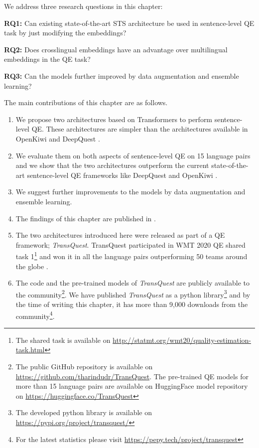 We address three research questions in this chapter:

\textbf{RQ1:} Can existing state-of-the-art STS architecture be used in sentence-level QE task by just modifying the embeddings?

\textbf{RQ2:} Does crosslingual embeddings have an advantage over multilingual embeddings in the QE task?

\textbf{RQ3:} Can the models further improved by data augmentation and ensemble learning?

     
The main contributions of this chapter are as follows.
\begin{enumerate}
	\item We propose two architectures based on Transformers to perform sentence-level QE. These architectures are simpler than the  architectures available in OpenKiwi and DeepQuest \autocite{lee-2020-two, wang-etal-2018-alibaba}. 
	
	\item We evaluate them on both aspects of sentence-level QE on 15 language pairs and we show that the two architectures outperform the current state-of-the-art sentence-level QE frameworks like DeepQuest \autocite{ive-etal-2018-deepquest} and OpenKiwi \autocite{kepler-etal-2019-openkiwi}.
	
	\item We suggest further improvements to the models by data augmentation and ensemble learning.
	
	\item The findings of this chapter are published in \autocite{ranasinghe-etal-2020-transquest}. 
	
	\item The two architectures introduced here were released as part of a QE framework; \textit{TransQuest}. TransQuest participated in WMT 2020 QE shared task 1\footnote{The shared task is available on \url{http://statmt.org/wmt20/quality-estimation-task.html}} \autocite{specia-etal-2020-findings-wmt} and won it in all the language pairs outperforming 50 teams around the globe \autocite{ranasinghe-etal-2020-transquest-wmt2020}.
	
	\item The code and the pre-trained models of \textit{TransQuest} are publicly available to the community\footnote{The public GitHub repository is available on \url{https://github.com/tharindudr/TransQuest}. The pre-trained QE models for more than 15 language pairs are available on HuggingFace model repository on \url{https://huggingface.co/TransQuest}}. We have published \textit{TransQuest} as a python library\footnote{The developed python library is available on \url{https://pypi.org/project/transquest/}} and by the time of writing this chapter, it has more than 9,000 downloads from the community\footnote{For the latest statistics please visit \url{https://pepy.tech/project/transquest}}. 
	
\end{enumerate}

